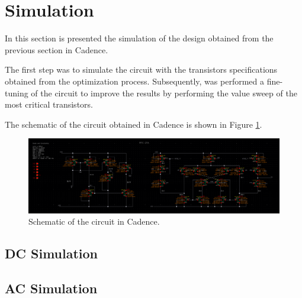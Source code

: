 \section{Simulation}

In this section is presented the simulation of the design obtained from the previous section in Cadence.

The first step was to simulate the circuit with the transistors specifications obtained from the optimization process. Subsequently, was performed a fine-tuning of the circuit to improve the results by performing the value sweep of the most critical transistors.

The schematic of the circuit obtained in Cadence is shown in Figure \ref{fig:OP}.

\begin{figure}[H]
    \centering
    \includegraphics[width=1\textwidth]{Images/OP.png}
    \caption{Schematic of the circuit in Cadence.}
    \label{fig:OP}
\end{figure}

\subsection{DC Simulation}

\subsection{AC Simulation}